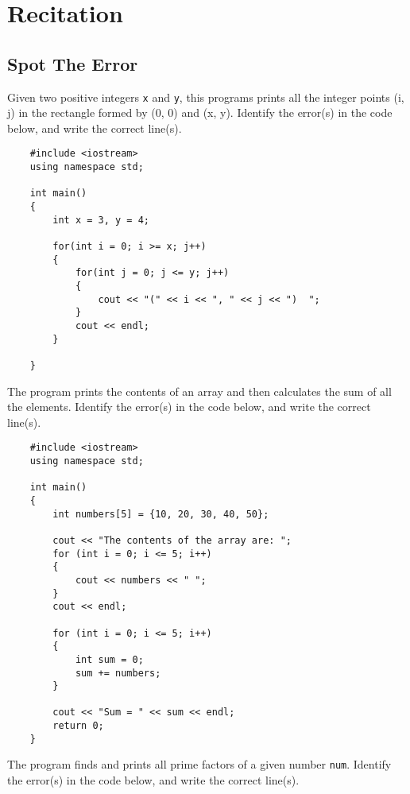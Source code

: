 \section{Recitation}

\subsection{Spot The Error}
\begin{multipart}
Given two positive integers \texttt{x} and \texttt{y}, this programs prints all the integer points (i, j) in the rectangle formed by (0, 0) and (x, y). Identify the error(s) in the code below, and write the correct line(s).
\end{multipart}

\begin{verbatim}
    #include <iostream>
    using namespace std;
    
    int main() 
    {
        int x = 3, y = 4;
    
        for(int i = 0; i >= x; j++)
        {
            for(int j = 0; j <= y; j++)
            {
                cout << "(" << i << ", " << j << ")  ";
            }
            cout << endl;
        }
    
    }
\end{verbatim}

\begin{multipart}
The program prints the contents of an array and then calculates the sum of all the elements. Identify the error(s) in the code below, and write the correct line(s).
\end{multipart}

\begin{verbatim}
    #include <iostream>
    using namespace std;
    
    int main()
    {
        int numbers[5] = {10, 20, 30, 40, 50};
    
        cout << "The contents of the array are: ";
        for (int i = 0; i <= 5; i++)
        {
            cout << numbers << " ";
        }
        cout << endl;
    
        for (int i = 0; i <= 5; i++)
        {
            int sum = 0;
            sum += numbers;
        }
    
        cout << "Sum = " << sum << endl;
        return 0;
    }
\end{verbatim}

\newpage

\begin{multipart}
The program finds and prints all prime factors of a given number \texttt{num}. Identify the error(s) in the code below, and write the correct line(s).
\end{multipart}

